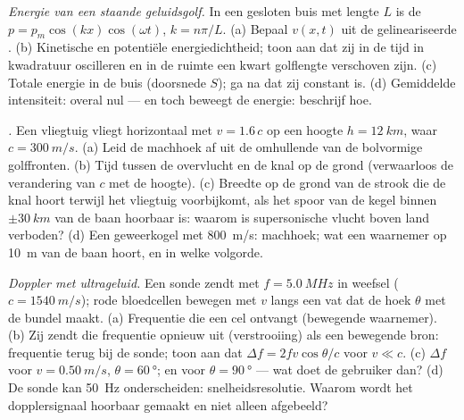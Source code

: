 \begin{exercise}[$\star\star\star$]\label{exo:b2:sound-waves:10}
\emph{Energie van een staande geluidsgolf.} In een gesloten buis met lengte
$L$ is de  $p = p_m\cos(kx)\cos(\omega t)$, $k = n\pi/L$. (a) Bepaal
$v(x,
t)$ uit de gelineariseerde . (b) Kinetische en
potentiële energiedichtheid; toon aan dat zij in de tijd in kwadratuur
oscilleren en in de ruimte een kwart golflengte verschoven zijn. (c) Totale
energie in de buis (doorsnede $S$); ga na dat zij constant is. (d)
Gemiddelde intensiteit: overal nul --- en toch beweegt de energie: beschrijf
hoe.
\end{exercise}

\begin{exercise}[$\star\star\star$]\label{exo:b2:sound-waves:11}
\emph{.} Een vliegtuig vliegt horizontaal met $v = 1.6\,c$
op een hoogte $h = \qty{12}{km}$, waar $c = \qty{300}{m/s}$. (a) Leid de
machhoek af uit de omhullende van de bolvormige golffronten. (b) Tijd tussen
de overvlucht en de knal op de grond (verwaarloos de verandering van $c$ met
de hoogte). (c) Breedte op de grond van de strook die de knal hoort terwijl
het vliegtuig voorbijkomt, als het spoor van de kegel binnen
$\pm\qty{30}{km}$ van de baan hoorbaar is: waarom is supersonische vlucht
boven land verboden? (d) Een geweerkogel met \qty{800}{m/s}: machhoek; wat
een waarnemer op \qty{10}{m} van de baan hoort, en in welke volgorde.
\end{exercise}

\begin{exercise}[$\star\star\star$]\label{exo:b2:sound-waves:12}
\emph{Doppler met ultrageluid.} Een sonde zendt met $f = \qty{5.0}{MHz}$ in
weefsel ($c = \qty{1540}{m/s}$); rode bloedcellen bewegen met $v$ langs een
vat dat de hoek $\theta$ met de bundel maakt. (a) Frequentie die een cel
ontvangt (bewegende waarnemer). (b) Zij zendt die frequentie opnieuw uit
(verstrooiing) als een bewegende bron: frequentie terug bij de sonde; toon
aan dat $\Delta f = 2fv\cos\theta/c$ voor $v \ll c$. (c) $\Delta f$ voor
$v = \qty{0.50}{m/s}$, $\theta = \qty{60}{\degree}$; en voor
$\theta = \qty{90}{\degree}$ --- wat doet de gebruiker dan? (d) De sonde kan
\qty{50}{Hz} onderscheiden: snelheidsresolutie. Waarom wordt het
dopplersignaal hoorbaar gemaakt en niet alleen afgebeeld?
\end{exercise}


